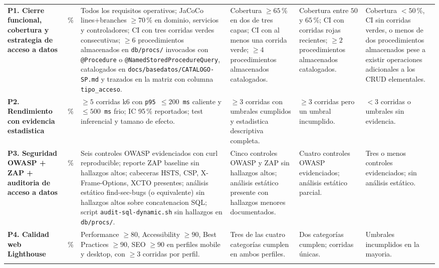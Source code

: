 \documentclass[11pt,a4paper]{article}
\begin{document}
{\begin{longtable}{|L{2.9cm}|C{0.9cm}|L{2.5cm}|L{2.5cm}|L{2.5cm}|L{2.3cm}|}
\textbf{P1. Cierre funcional, cobertura y estrategia de acceso a datos} &
\,\% &
Todos los requisitos operativos; JaCoCo lines+branches $\geq 70$\,\% en dominio, servicios y controladores; CI con tres corridas verdes consecutivas; $\geq 6$ procedimientos almacenados en \texttt{db/procs/} invocados con \texttt{@Procedure} o \texttt{@NamedStoredProcedureQuery}, catalogados en \texttt{docs/basedatos/CATALOGO-SP.md} y trazados en la matriz con columna \texttt{tipo\_acceso}. &
Cobertura $\geq 65$\,\% en dos de tres capas; CI con al menos una corrida verde; $\geq 4$ procedimientos almacenados catalogados. &
Cobertura entre $50$ y $65$\,\%; CI con corridas rojas recientes; $\geq 2$ procedimientos almacenados catalogados. &
Cobertura $< 50$\,\%, CI sin corridas verdes, o menos de dos procedimientos almacenados pese a existir operaciones adicionales a los CRUD elementales. \\

\textbf{P2. Rendimiento con evidencia estadistica} &
\,\% &
$\geq 5$ corridas k6 con \texttt{p95 $\leq 200$\,ms} caliente y \texttt{$\leq 500$\,ms} frio; IC 95\,\% reportados; test inferencial y tamano de efecto. &
$\geq 3$ corridas con umbrales cumplidos y estadistica descriptiva completa. &
$\geq 3$ corridas pero un umbral incumplido. &
$< 3$ corridas o umbrales sin evidencia. \\

\textbf{P3. Seguridad OWASP + ZAP + auditoria de acceso a datos} &
\,\% &
Seis controles OWASP evidenciados con curl reproducible; reporte ZAP baseline sin hallazgos altos; cabeceras HSTS, CSP, X-Frame-Options, XCTO presentes; an\'{a}lisis est\'{a}tico find-sec-bugs (o equivalente) sin hallazgos altos sobre concatenacion SQL; script \texttt{audit-sql-dynamic.sh} sin hallazgos en \texttt{db/procs/}. &
Cinco controles OWASP y ZAP sin hallazgos altos; an\'{a}lisis est\'{a}tico presente con hallazgos menores documentados. &
Cuatro controles OWASP evidenciados; an\'{a}lisis est\'{a}tico parcial. &
Tres o menos controles evidenciados; sin an\'{a}lisis est\'{a}tico. \\

\textbf{P4. Calidad web Lighthouse} &
\,\% &
Performance $\geq 80$, Accessibility $\geq 90$, Best Practices $\geq 90$, SEO $\geq 90$ en perfiles mobile y desktop, con $\geq 3$ corridas por perfil. &
Tres de las cuatro categor\'{i}as cumplen en ambos perfiles. &
Dos categor\'{i}as cumplen; corridas \'{u}nicas. &
Umbrales incumplidos en la mayoria. \\


\end{longtable}}
\end{document}
